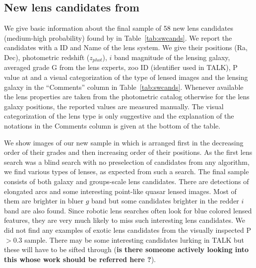 \documentclass[useAMS,usenatbib,a4paper]{mn2e}
\begin{document}

\subsection{New lens candidates from \sw}
\label{sec:results:newcand}

We give basic information about the final sample of 58 new lens
candidates (medium-high probability) found by \sw in
Table~\ref{tab:swcands}. We report the candidates with a \sw ID and Name
of the lens system. We give their positions (Ra, Dec), photometric
redshift ($z_{phot}$), $i$ band magnitude of the lensing galaxy,
averaged grade G from the lens experts, zoo ID (identifier used in
TALK), P value at \StageTwo and a visual categorization of the type of
lensed images and the lensing galaxy in the ``Comments'' column in
Table~\ref{tab:swcands}. Whenever available the lens properties are
taken from the \cfhtls photometric catalog \citep{Coupon2009} otherwise
for the lens galaxy positions, the reported values are measured
manually. The visual categorization of the lens type is only suggestive
and the explanation of the notations in the Comments column is given at
the bottom of the table.

We show images of our new sample in  which is arranged
first in the decreasing order of their grades and then increasing order
of their positions. As the first lens search was a blind search with no
preselection of candidates from any algorithm, we find various types of
lenses, as expected from such a search. The final sample consists of
both galaxy and groups-scale lens candidates. There are detections of
elongated arcs and some interesting point-like quasar lensed images.
Most of them are brighter in bluer $g$ band but some candidates brighter
in the redder $i$ band are also found. Since robotic lens searches often
look for blue colored lensed features, they are very much likely to miss
such interesting lens candidates. We did not find any examples of
exotic lens candidates from the visually inspected P$>0.3$ sample. There
may be some interesting candidates lurking in TALK but these will have
to be sifted through ({\bf is there someone actively looking into this
whose work should be referred here ?}).
\end{document}
